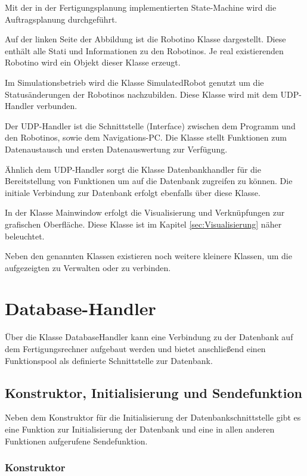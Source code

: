 Mit der in der Fertigungsplanung implementierten State-Machine wird die Auftragsplanung durchgeführt.

Auf der linken Seite der Abbildung ist die Robotino Klasse dargestellt. Diese enthält alle Stati und Informationen zu den Robotinos. Je real existierenden Robotino wird ein Objekt dieser Klasse erzeugt.

Im Simulationsbetrieb wird die Klasse SimulatedRobot genutzt um die Statusänderungen der Robotinos nachzubilden. Diese Klasse wird mit dem UDP-Handler verbunden. 

Der UDP-Handler ist die Schnittstelle (Interface) zwischen dem Programm und den Robotinos, sowie dem Navigations-PC. Die Klasse stellt Funktionen zum Datenaustausch und ersten Datenauswertung zur Verfügung. 

Ähnlich dem UDP-Handler sorgt die Klasse Datenbankhandler für die Bereitstellung von Funktionen um auf die Datenbank zugreifen zu können. Die initiale Verbindung zur Datenbank erfolgt ebenfalls über diese Klasse.

In der Klasse Mainwindow erfolgt die Visualisierung und Verknüpfungen zur grafischen Oberfläche. Diese Klasse ist im Kapitel \ref{sec:Visualisierung} näher beleuchtet.

Neben den genannten Klassen existieren noch weitere kleinere Klassen, um die aufgezeigten zu Verwalten oder zu verbinden. 

\section{Database-Handler}
\label{sec:Databasehandler}

Über die Klasse DatabaseHandler kann eine Verbindung zu der Datenbank auf dem Fertigungsrechner aufgebaut werden und bietet anschließend einen Funktionspool als definierte Schnittstelle zur Datenbank.

\subsection{Konstruktor, Initialisierung und Sendefunktion}

Neben dem Konstruktor für die Initialisierung der Datenbankschnittstelle gibt es eine Funktion zur Initialisierung der Datenbank und eine in allen anderen Funktionen aufgerufene Sendefunktion. 

\subsubsection{Konstruktor}

